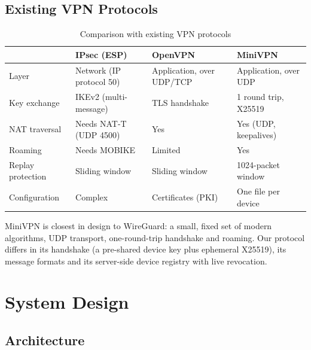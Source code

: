 \documentclass[12pt,a4paper]{report}
\begin{document}
\section{Existing VPN Protocols}
\begin{table}[H]
\centering
\caption{Comparison with existing VPN protocols}
\begin{tabularx}{\textwidth}{@{}lXXX@{}}
\toprule
 & \textbf{IPsec (ESP)} & \textbf{OpenVPN} & \textbf{MiniVPN}\\
\midrule
Layer & Network (IP protocol 50) & Application, over UDP/TCP & Application, over UDP\\
Key exchange & IKEv2 (multi-message) & TLS handshake & 1 round trip, X25519\\
NAT traversal & Needs NAT-T (UDP 4500) & Yes & Yes (UDP, keepalives)\\
Roaming & Needs MOBIKE & Limited & Yes\\
Replay protection & Sliding window & Sliding window & 1024-packet window\\
Configuration & Complex & Certificates (PKI) & One file per device\\
\bottomrule
\end{tabularx}
\end{table}
MiniVPN is closest in design to WireGuard: a small, fixed set of modern algorithms,
UDP transport, one-round-trip handshake and roaming. Our protocol differs in its
handshake (a pre-shared device key plus ephemeral X25519), its message formats and
its server-side device registry with live revocation.

\chapter{System Design}\label{ch:design}

\section{Architecture}
\end{document}
